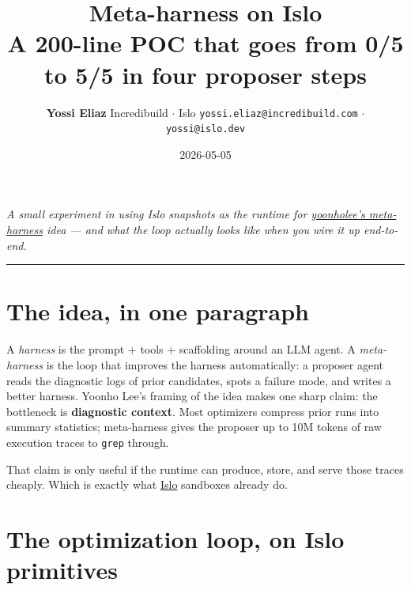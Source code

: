 \documentclass[11pt]{article}
\title{\vspace{-2em}\textbf{Meta-harness on Islo}\\[0.3em]
\large\normalfont A 200-line POC that goes from 0/5 to 5/5 in four proposer steps}
\author{\normalsize \textbf{Yossi Eliaz}\quad
  \textcolor{dim}{\small Incredibuild $\cdot$ Islo \quad
  \texttt{yossi.eliaz@incredibuild.com} $\cdot$ \texttt{yossi@islo.dev}}}
\date{\normalsize 2026-05-05}
\begin{document}
\maketitle
\thispagestyle{fancy}

\begin{center}
\textit{\color{dim}\small A small experiment in using Islo snapshots as the runtime for
\href{https://yoonholee.com/meta-harness/}{yoonholee's meta-harness} idea ---
and what the loop actually looks like when you wire it up end-to-end.}
\end{center}

\vspace{0.5em}
{\color{border}\hrule}
\vspace{1em}

\section*{The idea, in one paragraph}

A \emph{harness} is the prompt + tools + scaffolding around an LLM agent. A
\emph{meta-harness} is the loop that improves the harness automatically: a
proposer agent reads the diagnostic logs of prior candidates, spots a failure
mode, and writes a better harness. Yoonho Lee's framing of the idea makes one
sharp claim: the bottleneck is \textbf{diagnostic context}. Most optimizers
compress prior runs into summary statistics; meta-harness gives the proposer
up to 10M tokens of raw execution traces to \texttt{grep} through.

That claim is only useful if the runtime can produce, store, and serve those
traces cheaply. Which is exactly what \href{https://islo.dev/}{Islo} sandboxes
already do.

\section*{The optimization loop, on Islo primitives}
\end{document}
